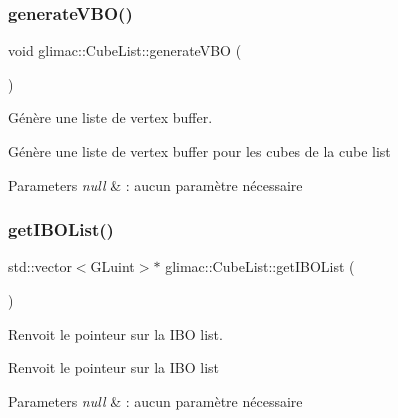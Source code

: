 \subsubsection{\texorpdfstring{generate\+V\+B\+O()}{generateVBO()}}
{\footnotesize\ttfamily void glimac\+::\+Cube\+List\+::generate\+V\+BO (\begin{DoxyParamCaption}{ }\end{DoxyParamCaption})}



Génère une liste de vertex buffer. 

Génère une liste de vertex buffer pour les cubes de la cube list


\begin{DoxyParams}{Parameters}
{\em null} & \+: aucun paramètre nécessaire \\
\hline
\end{DoxyParams}
\mbox{\label{classglimac_1_1CubeList_acd588ce7b0feb5f2fc72d6579887e47e}} 
\subsubsection{\texorpdfstring{get\+I\+B\+O\+List()}{getIBOList()}}
{\footnotesize\ttfamily std\+::vector$<$G\+Luint$>$$\ast$ glimac\+::\+Cube\+List\+::get\+I\+B\+O\+List (\begin{DoxyParamCaption}{ }\end{DoxyParamCaption})\hspace{0.3cm}{\ttfamily [inline]}}



Renvoit le pointeur sur la I\+BO list. 

Renvoit le pointeur sur la I\+BO list


\begin{DoxyParams}{Parameters}
{\em null} & \+: aucun paramètre nécessaire \\
\hline
\end{DoxyParams}
\mbox{\label{classglimac_1_1CubeList_a1b1b153b8b2171e65e9c040cfa424892}} 
